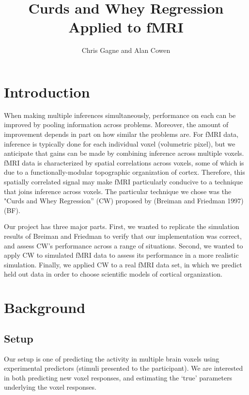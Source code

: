 \documentclass{article}
\title{Curds and Whey Regression Applied to
fMRI}
\author{Chris Gagne and Alan Cowen}
\begin{document}
    
    
    \maketitle
    
    

    



    

\section{Introduction}\label{introduction}

When making multiple inferences simultaneously, performance on each
can be improved by pooling information across problems. Moreover, the
amount of improvement depends in part on how similar the problems are.
For fMRI data, inference is typically done for each individual voxel (volumetric pixel),
but we anticipate that gains can be made by combining inference across
multiple voxels. fMRI data is characterized by spatial correlations
across voxels, some of which is due to a functionally-modular
topographic organization of cortex. Therefore, this spatially correlated
signal may make fMRI particularly conducive to a technique that joins
inference across voxels. The particular technique we chose was the
"Curds and Whey Regression'' (CW) proposed by (Breiman and Friedman
1997)(BF).

Our project has three major parts. First, we wanted to replicate the
simulation results of Breiman and Friedman to verify that our
implementation was correct, and assess CW's performance across a range
of situations. Second, we wanted to apply CW to simulated fMRI data to
assess its performance in a more realistic simulation. Finally, we
applied CW to a real fMRI data set, in which we predict held out data in
order to choose scientific models of cortical organization.

\section{Background}\label{background}

\subsection{Setup}\label{setup}

Our setup is one of predicting the activity in multiple brain voxels
using experimental predictors (stimuli presented to the
participant). We are interested in both predicting new voxel responses,
and estimating the `true' parameters underlying the voxel responses.
\end{document}
